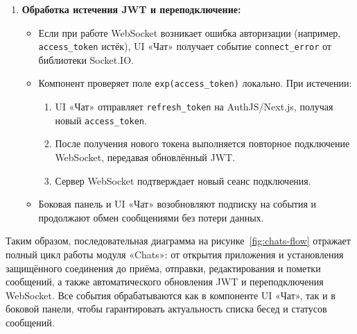 \begin{enumerate}
    \item \textbf{Обработка истечения JWT и переподключение:}
    \begin{itemize}
        \item Если при работе WebSocket возникает ошибка авторизации (например, \texttt{access\_token} истёк), UI «Чат» получает событие \texttt{connect\_error} от библиотеки Socket.IO.
        \item Компонент проверяет поле \texttt{exp(access\_token)} локально. При истечении:
        \begin{enumerate}
            \item UI «Чат» отправляет \texttt{refresh\_token} на AuthJS/Next.js, получая новый \texttt{access\_token}.
            \item После получения нового токена выполняется повторное подключение WebSocket, передавая обновлённый JWT.
            \item Сервер WebSocket подтверждает новый сеанс подключения.
        \end{enumerate}
        \item Боковая панель и UI «Чат» возобновляют подписку на события и продолжают обмен сообщениями без потери данных.
    \end{itemize}
\end{enumerate}

Таким образом, последовательная диаграмма на рисунке~\ref{fig:chats-flow} отражает полный цикл работы модуля «Chats»: от открытия приложения и установления защищённого соединения до приёма, отправки, редактирования и пометки сообщений, а также автоматического обновления JWT и переподключения WebSocket. Все события обрабатываются как в компоненте UI «Чат», так и в боковой панели, чтобы гарантировать актуальность списка бесед и статусов сообщений.
